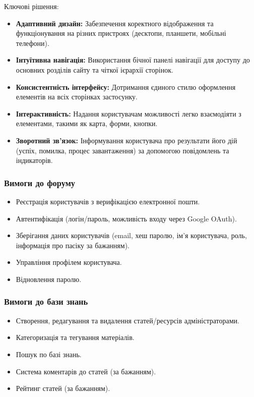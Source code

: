 Ключові рішення:
\begin{itemize}
    \item \textbf{Адаптивний дизайн:} Забезпечення коректного відображення та функціонування на різних пристроях (десктопи, планшети, мобільні телефони).
    \item \textbf{Інтуїтивна навігація:} Використання бічної панелі навігації для доступу до основних розділів сайту та чіткої ієрархії сторінок.
    \item \textbf{Консистентність інтерфейсу:} Дотримання єдиного стилю оформлення елементів на всіх сторінках застосунку.
    \item \textbf{Інтерактивність:} Надання користувачам можливості легко взаємодіяти з елементами, такими як карта, форми, кнопки.
    \item \textbf{Зворотний зв'язок:} Інформування користувача про результати його дій (успіх, помилка, процес завантаження) за допомогою повідомлень та індикаторів.
\end{itemize}

\subsubsection{Вимоги до форуму}
\begin{itemize}
    \item Реєстрація користувачів з верифікацією електронної пошти.
    \item Автентифікація (логін/пароль, можливість входу через Google OAuth).
    \item Зберігання даних користувачів (email, хеш паролю, ім'я користувача, роль, інформація про пасіку за бажанням).
    \item Управління профілем користувача.
    \item Відновлення паролю.
\end{itemize}

\subsubsection{Вимоги до бази знань}
\begin{itemize}
    \item Створення, редагування та видалення статей/ресурсів адміністраторами.
    \item Категоризація та тегування матеріалів.
    \item Пошук по базі знань.
    \item Система коментарів до статей (за бажанням).
    \item Рейтинг статей (за бажанням).
\end{itemize}

